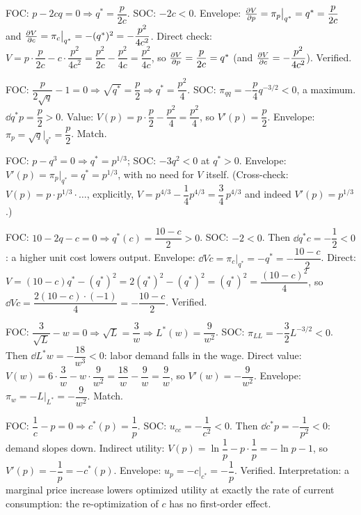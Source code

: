 \begin{solutions}
  \item FOC: $p-2cq=0\Rightarrow q^*=\dfrac{p}{2c}$. SOC: $-2c<0$.
        Envelope: $\frac{\partial V}{\partial p}=\pi_p\big|_{q^*}=q^*=\dfrac{p}{2c}$ and
        $\frac{\partial V}{\partial c}=\pi_c\big|_{q^*}=-(q^*)^2=-\dfrac{p^2}{4c^2}$.
        Direct check:
        $V=p\cdot\dfrac{p}{2c}-c\cdot\dfrac{p^2}{4c^2}
        =\dfrac{p^2}{2c}-\dfrac{p^2}{4c}=\dfrac{p^2}{4c}$, so
        $\frac{\partial V}{\partial p}=\dfrac{p}{2c}=q^*$ (and
        $\frac{\partial V}{\partial c}=-\dfrac{p^2}{4c^2}$). Verified.

  \item FOC: $\dfrac{p}{2\sqrt q}-1=0\Rightarrow\sqrt{q^*}=\dfrac p2
        \Rightarrow q^*=\dfrac{p^2}{4}$. SOC:
        $\pi_{qq}=-\dfrac{p}{4}q^{-3/2}<0$, a maximum.
        $\dd{q^*}{p}=\dfrac p2>0$. Value:
        $V(p)=p\cdot\dfrac p2-\dfrac{p^2}4=\dfrac{p^2}4$, so
        $V'(p)=\dfrac p2$. Envelope:
        $\pi_p=\sqrt q\big|_{q^*}=\dfrac p2$. Match.

  \item FOC: $p-q^3=0\Rightarrow q^*=p^{1/3}$; SOC: $-3q^2<0$ at
        $q^*>0$. Envelope:
        $V'(p)=\pi_p\big|_{q^*}=q^*=p^{1/3}$, with no need for $V$
        itself. (Cross-check: $V(p)=p\cdot p^{1/3}\cdot\ldots$,
        explicitly, $V=p^{4/3}-\dfrac14p^{4/3}=\dfrac34\,p^{4/3}$ and
        indeed $V'(p)=p^{1/3}$.)

  \item FOC: $10-2q-c=0\Rightarrow q^*(c)=\dfrac{10-c}{2}>0$. SOC:
        $-2<0$. Then $\dd{q^*}{c}=-\dfrac12<0$: a higher unit cost
        lowers output. Envelope:
        $\dd{V}{c}=\pi_c\big|_{q^*}=-q^*=-\dfrac{10-c}{2}$. Direct:
        $V=(10-c)q^*-(q^*)^2=2(q^*)^2-(q^*)^2=(q^*)^2
        =\dfrac{(10-c)^2}{4}$, so
        $\dd{V}{c}=\dfrac{2(10-c)\cdot(-1)}{4}=-\dfrac{10-c}{2}$.
        Verified.

  \item FOC: $\dfrac{3}{\sqrt L}-w=0\Rightarrow\sqrt L=\dfrac3w
        \Rightarrow L^*(w)=\dfrac{9}{w^2}$. SOC:
        $\pi_{LL}=-\dfrac32L^{-3/2}<0$. Then
        $\dd{L^*}{w}=-\dfrac{18}{w^3}<0$: labor demand falls in the
        wage. Direct value:
        $V(w)=6\cdot\dfrac3w-w\cdot\dfrac9{w^2}
        =\dfrac{18}w-\dfrac9w=\dfrac9w$, so $V'(w)=-\dfrac9{w^2}$.
        Envelope: $\pi_w=-L\big|_{L^*}=-\dfrac9{w^2}$. Match.

  \item FOC: $\dfrac1c-p=0\Rightarrow c^*(p)=\dfrac1p$. SOC:
        $u_{cc}=-\dfrac1{c^2}<0$. Then
        $\dd{c^*}{p}=-\dfrac1{p^2}<0$: demand slopes down. Indirect
        utility: $V(p)=\ln\dfrac1p-p\cdot\dfrac1p=-\ln p-1$, so
        $V'(p)=-\dfrac1p=-c^*(p)$. Envelope:
        $u_p=-c\big|_{c^*}=-\dfrac1p$. Verified. Interpretation: a
        marginal price increase lowers optimized utility at exactly the
        rate of current consumption: the re-optimization of $c$ has
        no first-order effect.


\end{solutions}
